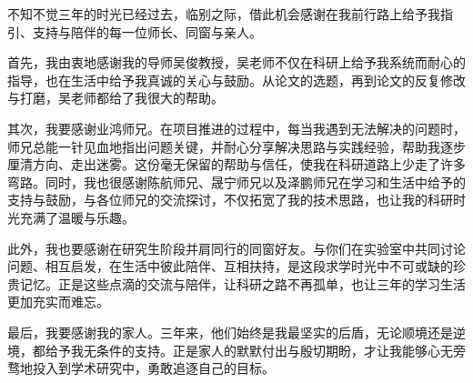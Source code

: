 \documentclass[type=master]{fduthesis}
\begin{document}
	\begin{acknowledgements}
	不知不觉三年的时光已经过去，临别之际，借此机会感谢在我前行路上给予我指引、支持与陪伴的每一位师长、同窗与亲人。

	首先，我由衷地感谢我的导师吴俊教授，吴老师不仅在科研上给予我系统而耐心的指导，也在生活中给予我真诚的关心与鼓励。从论文的选题，再到论文的反复修改与打磨，吴老师都给了我很大的帮助。

	其次，我要感谢业鸿师兄。在项目推进的过程中，每当我遇到无法解决的问题时，师兄总能一针见血地指出问题关键，并耐心分享解决思路与实践经验，帮助我逐步厘清方向、走出迷雾。这份毫无保留的帮助与信任，使我在科研道路上少走了许多弯路。同时，我也很感谢陈航师兄、晟宁师兄以及泽鹏师兄在学习和生活中给予的支持与鼓励，与各位师兄的交流探讨，不仅拓宽了我的技术思路，也让我的科研时光充满了温暖与乐趣。

	此外，我也要感谢在研究生阶段并肩同行的同窗好友。与你们在实验室中共同讨论问题、相互启发，在生活中彼此陪伴、互相扶持，是这段求学时光中不可或缺的珍贵记忆。正是这些点滴的交流与陪伴，让科研之路不再孤单，也让三年的学习生活更加充实而难忘。

	最后，我要感谢我的家人。三年来，他们始终是我最坚实的后盾，无论顺境还是逆境，都给予我无条件的支持。正是家人的默默付出与殷切期盼，才让我能够心无旁骛地投入到学术研究中，勇敢追逐自己的目标。
	\end{acknowledgements}
	
\end{document}
